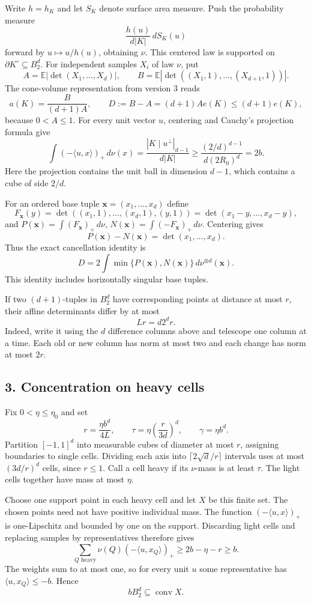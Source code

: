 \documentclass[
  11pt,
]{article}
\begin{document}
Write \(h=h_K\) and let \(S_K\) denote surface area measure. Push the
probability measure \[\frac{h(u)}{d|K|}\,dS_K(u)\] forward by
\(u\mapsto u/h(u)\), obtaining \(\nu\). This centered law is supported
on \(\partial K^\circ\subseteq B_2^d\). For independent samples \(X_i\)
of law \(\nu\), put \[A=\mathbb E|\det(X_1,\ldots,X_d)|,\qquad
B=\mathbb E|\det((X_1,1),\ldots,(X_{d+1},1))|.\] The cone-volume
representation from version 3 reads \[a(K)=\frac B{(d+1)A},\qquad
D:=B-A=(d+1)Ae(K)\le(d+1)e(K),\tag{2.2}\] because \(0<A\le1\). For every
unit vector \(u\), centering and Cauchy's projection formula give
\[\int(-\langle u,x\rangle)_+\,d\nu(x)
=\frac{|K\mid u^\perp|_{d-1}}{d|K|}
\ge\frac{(2/d)^{d-1}}{d(2R_0)^d}=2b.\tag{2.3}\] Here the projection
contains the unit ball in dimension \(d-1\), which contains a cube of
side \(2/d\).

For an ordered base tuple \(\mathbf x=(x_1,\ldots,x_d)\) define
\[F_{\mathbf x}(y)=\det((x_1,1),\ldots,(x_d,1),(y,1))
=\det(x_1-y,\ldots,x_d-y),\] and
\(P(\mathbf x)=\int(F_{\mathbf x})_+\,d\nu\),
\(N(\mathbf x)=\int(-F_{\mathbf x})_+\,d\nu\). Centering gives
\[P(\mathbf x)-N(\mathbf x)=\det(x_1,\ldots,x_d).\] Thus the exact
cancellation identity is
\[D=2\int\min\{P(\mathbf x),N(\mathbf x)\}\,d\nu^{\otimes d}(\mathbf x).\tag{2.4}\]
This identity includes horizontally singular base tuples.

If two \((d+1)\)-tuples in \(B_2^d\) have corresponding points at
distance at most \(r\), their affine determinants differ by at most
\[Lr=d2^dr.\tag{2.5}\] Indeed, write it using the \(d\) difference
columns above and telescope one column at a time. Each old or new column
has norm at most two and each change has norm at most \(2r\).

\subsection{3. Concentration on heavy
cells}\label{concentration-on-heavy-cells}

Fix \(0<\eta\le\eta_0\) and set \[r=\frac{\eta b^d}{4L},\qquad
\tau=\eta\left(\frac r{3d}\right)^d,\qquad
\gamma=\eta b^d.\tag{3.1}\] Partition \([-1,1]^d\) into measurable cubes
of diameter at most \(r\), assigning boundaries to single cells.
Dividing each axis into \(\lceil2\sqrt d/r\rceil\) intervals uses at
most \((3d/r)^d\) cells, since \(r\le1\). Call a cell heavy if its
\(\nu\)-mass is at least \(\tau\). The light cells together have mass at
most \(\eta\).

Choose one support point in each heavy cell and let \(X\) be this finite
set. The chosen points need not have positive individual mass. The
function \((-\langle u,x\rangle)_+\) is one-Lipschitz and bounded by one
on the support. Discarding light cells and replacing samples by
representatives therefore gives
\[\sum_{Q\text{ heavy}}\nu(Q)(-\langle u,x_Q\rangle)_+
\ge2b-\eta-r\ge b.\] The weights sum to at most one, so for every unit
\(u\) some representative has \(\langle u,x_Q\rangle\le-b\). Hence
\[bB_2^d\subseteq\operatorname{conv}X.\tag{3.2}\]
\end{document}
